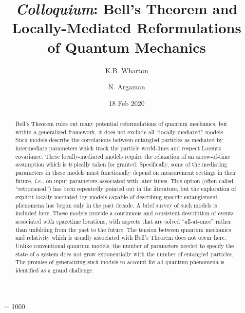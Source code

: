 \documentclass[onecolumn, nofootinbib, 12pt]{revtex4-1}
\begin{document}
\count\footins = 1000

\title{{\it Colloquium}: Bell's Theorem and Locally-Mediated Reformulations of Quantum Mechanics}
\author{K.B. Wharton}
\author{N. Argaman}
\date{18 Feb 2020}       %

\begin{abstract}

Bell's Theorem rules out many potential reformulations of quantum mechanics, but within a generalized framework, it does not exclude all ``locally-mediated'' models.  Such models describe the correlations between entangled particles as mediated by intermediate parameters which track the particle world-lines and respect Lorentz covariance.  These locally-mediated models require the relaxation of an arrow-of-time assumption which is typically taken for granted.  Specifically, some of the mediating parameters in these models must functionally depend on measurement settings in their future, \emph{i.e.}, on input parameters associated with later times.  This option (often called ``retrocausal'') has been repeatedly pointed out in the literature, but the exploration of explicit locally-mediated toy-models capable of describing specific entanglement phenomena has begun only in the past decade.  A brief survey of such models is included here.  These models provide a continuous and consistent description of events associated with spacetime locations, with aspects that are solved ``all-at-once'' rather than unfolding from the past to the future.  The tension between quantum mechanics and relativity which is usually associated with Bell's Theorem does not occur here.  Unlike conventional quantum models, the number of parameters needed to specify the state of a system does not grow exponentially with the number of entangled particles.  The promise of generalizing such models to account for all quantum phenomena is identified as a grand challenge.

\end{abstract}


\maketitle
\end{document}
